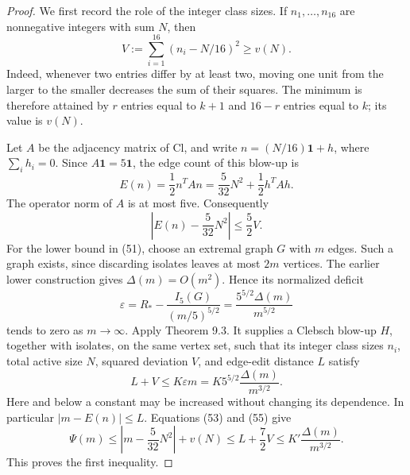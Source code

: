 \begin{proof}
We first record the role of the integer class sizes. If
$n_1,\ldots,n_{16}$ are nonnegative integers with sum $N$, then
\begin{equation}\tag{53}\label{eq:53}
 V:=\sum_{i=1}^{16}(n_i-N/16)^2\geq v(N).
\end{equation}
Indeed, whenever two entries differ by at least two, moving one unit from
the larger to the smaller decreases the sum of their squares. The minimum
is therefore attained by $r$ entries equal to $k+1$ and $16-r$ entries equal
to $k$; its value is $v(N)$.

Let $A$ be the adjacency matrix of $\mathrm{Cl}$, and write
$n=(N/16)\mathbf1+h$, where $\sum_i h_i=0$. Since $A\mathbf1=5\mathbf1$,
the edge count of this blow-up is
\begin{equation}\tag{54}\label{eq:54}
 E(n)=\frac12n^TAn=\frac5{32}N^2+\frac12h^TAh.
\end{equation}
The operator norm of $A$ is at most five. Consequently
\begin{equation}\tag{55}\label{eq:55}
 \left|E(n)-\frac5{32}N^2\right|\leq\frac52 V.
\end{equation}
For the lower bound in (51), choose an extremal graph $G$ with $m$ edges.
Such a graph exists, since discarding isolates leaves at most $2m$ vertices.
The earlier lower construction gives $\Delta(m)=O(m^2)$. Hence its
normalized deficit
\[
 \varepsilon=R_\ast-\frac{I_5(G)}{(m/5)^{5/2}}
 =\frac{5^{5/2}\Delta(m)}{m^{5/2}}
\]
tends to zero as $m\to\infty$. Apply Theorem 9.3. It supplies a Clebsch
blow-up $H$, together with isolates, on the same vertex set, such that its
integer class sizes $n_i$, total active size $N$, squared deviation $V$, and
edge-edit distance $L$ satisfy
\[
 L+V\leq K\varepsilon m=K5^{5/2}\frac{\Delta(m)}{m^{3/2}}.
\]
Here and below a constant may be increased without changing its dependence.
In particular $|m-E(n)|\leq L$. Equations (53) and (55) give
\[
 \Psi(m)\leq\left|m-\frac5{32}N^2\right|+v(N)
 \leq L+\frac72V\leq K'\frac{\Delta(m)}{m^{3/2}}.
\]
This proves the first inequality.


\end{proof}
